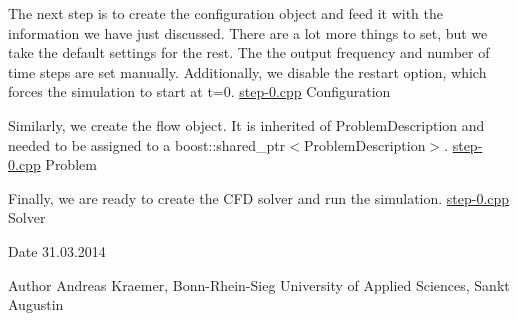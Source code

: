 The next step is to create the configuration object and feed it with the information we have just discussed. There are a lot more things to set, but we take the default settings for the rest. The the output frequency and number of time steps are set manually. Additionally, we disable the restart option, which forces the simulation to start at t=0.  \hyperlink{step-0_8cpp}{step-\/0.cpp} Configuration

Similarly, we create the flow object. It is inherited of ProblemDescription and needed to be assigned to a boost::shared\_\-ptr$<$ProblemDescription$>$.  \hyperlink{step-0_8cpp}{step-\/0.cpp} Problem

Finally, we are ready to create the CFD solver and run the simulation.  \hyperlink{step-0_8cpp}{step-\/0.cpp} Solver

\begin{DoxyDate}{Date}
31.03.2014 
\end{DoxyDate}
\begin{DoxyAuthor}{Author}
Andreas Kraemer, Bonn-\/Rhein-\/Sieg University of Applied Sciences, Sankt Augustin
\end{DoxyAuthor}

